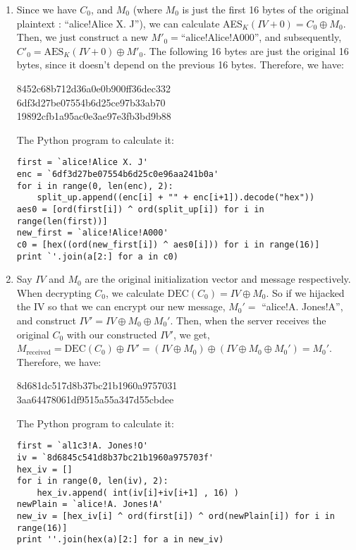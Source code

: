 \begin{enumerate}
\begin{enumerate}
      \item Since we have $C_0$, and $M_0$ (where $M_0$ is just the first 16 bytes of the original plaintext : ``alice!Alice X. J''), we can calculate AES$_K(IV + 0) = C_0 \oplus M_0$. Then, we just construct a new $M'_0 = \text{``alice!Alice!A000''}$, and subsequently, $C'_0 = \text{AES}_K(IV + 0) \oplus M'_0$. The following 16 bytes are just the original 16 bytes, since it doesn't depend on the previous 16 bytes. Therefore, we have:
        \begin{center}
          8452c68b712d36a0e0b900ff36dec332\\
          6df3d27be07554b6d25ce97b33ab70\\
          19892cfb1a95ac0e3ae97e3fb3bd9b88\\
        \end{center}
        The Python program to calculate it:
\begin{verbatim}
first = `alice!Alice X. J'
enc = `6df3d27be07554b6d25c0e96aa241b0a'
for i in range(0, len(enc), 2):
    split_up.append((enc[i] + "" + enc[i+1]).decode("hex"))
aes0 = [ord(first[i]) ^ ord(split_up[i]) for i in range(len(first))]
new_first = `alice!Alice!A000'
c0 = [hex((ord(new_first[i]) ^ aes0[i])) for i in range(16)]
print `'.join(a[2:] for a in c0)      
\end{verbatim}

      \item Say $IV$ and $M_0$ are the original initialization vector and message respectively. When decrypting $C_0$, we calculate $\text{DEC}(C_0) = IV \oplus M_0$. So if we hijacked the IV so that we can encrypt our new message, $M_0' = $ ``alice!A. Jones!A'', and construct $IV' = IV \oplus M_0 \oplus M_0'$. Then, when the server receives the original $C_0$ with our constructed $IV'$, we get, $M_{\text{received}} = \text{DEC}(C_0) \oplus IV' = (IV \oplus M_0) \oplus (IV \oplus M_0 \oplus M_0') = M_0'$.
        Therefore, we have: 
        \begin{center}
          8d681dc517d8b37bc21b1960a9757031\\
          3aa64478061df9515a55a347d55cbdee\\
        \end{center}
        
The Python program to calculate it:
\begin{verbatim}
first = `al1c3!A. Jones!O'
iv = `8d6845c541d8b37bc21b1960a975703f'
hex_iv = []
for i in range(0, len(iv), 2):
    hex_iv.append( int(iv[i]+iv[i+1] , 16) )
newPlain = `alice!A. Jones!A'
new_iv = [hex_iv[i] ^ ord(first[i]) ^ ord(newPlain[i]) for i in range(16)]
print ''.join(hex(a)[2:] for a in new_iv)
\end{verbatim}
    \end{enumerate}
\newpage


\end{enumerate}
